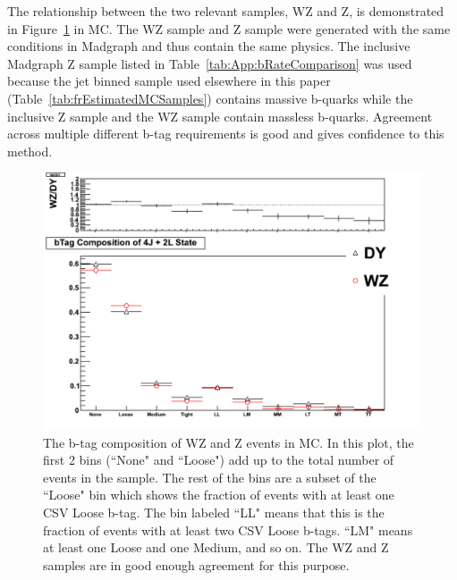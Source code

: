 The relationship between the two relevant samples, WZ and Z, is demonstrated in Figure~\ref{fig:wz_v_dy_btags} in MC. The WZ sample and Z sample were generated with the same conditions in Madgraph and thus contain the same physics. The inclusive Madgraph Z sample listed in Table~\ref{tab:App:bRateComparison} was used because the jet binned sample used elsewhere in this paper (Table~\ref{tab:frEstimatedMCSamples}) contains massive b-quarks while the inclusive Z sample and the WZ sample contain massless b-quarks. Agreement across multiple different b-tag requirements is good and gives confidence to this method.\\

\begin{figure}[h]
\begin{center}
\includegraphics[width=0.90\linewidth]{Figs/WZ_Vs_DY_bComposition.pdf}
\caption{\label{fig:wz_v_dy_btags}
The b-tag composition of WZ and Z events in MC. In this plot, the first 2 bins (``None" and ``Loose") add up to the total number of events in the sample. The rest of the bins are a subset of the ``Loose" bin which shows the fraction of events with at least one CSV Loose b-tag. The bin labeled ``LL" means that this is the fraction of events with at least two CSV Loose b-tags. ``LM" means at least one Loose and one Medium, and so on. The WZ and Z samples are in good enough agreement for this purpose.
}
\end{center}
\end{figure}

